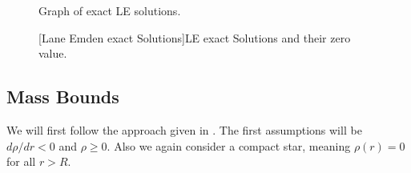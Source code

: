 \begin{minipage}[t]{0.5\textwidth}
	\begin{figure}[H]
		\caption[Graph of exact Lane Emden Solutions]{Graph of exact \ac{LE} solutions.}
		\label{fig:3-Mass-Plt-LE-Exact-Results-Plots}
	\end{figure}
\end{minipage}\hfill%
\begin{minipage}[t]{0.45\textwidth}
	\begin{figure}[H]
		[Lane Emden exact Solutions]{\ac{LE} exact Solutions and their zero value.}
		\label{fig:3-Mass-Tbl-LE-Exact-Results}
	\end{figure}
\end{minipage}
%
%
%
%
\subsection{Mass Bounds}
\label{subsec:3-Mass-Mass-Bounds}
We will first follow the approach given in \cite{waldGeneralRelativity1984}. 
The first assumptions will be $d\rho/dr<0$ and $\rho\geq0$. 
Also we again consider a compact star, meaning $\rho(r)=0$ for all $r>R$.
%
%

